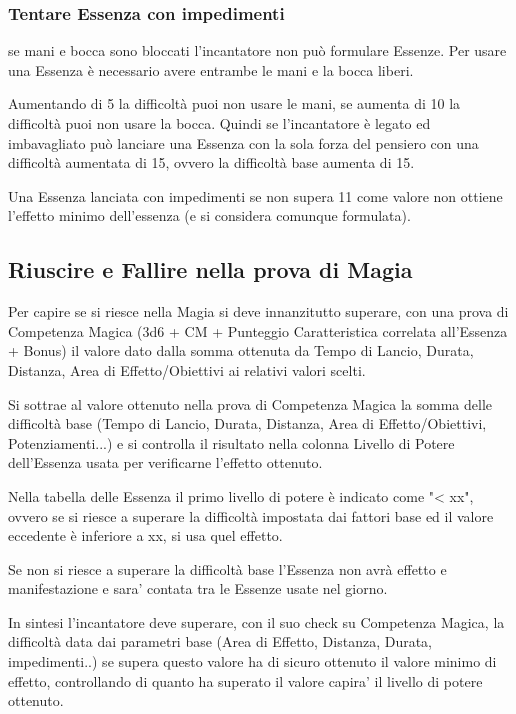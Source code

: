 \documentclass[a4paper,11pt,twoside,openany]{book}
\begin{document}
\subsubsection{Tentare Essenza con impedimenti}

se mani e bocca sono bloccati l'incantatore non può formulare Essenze. Per usare una Essenza è necessario avere entrambe le mani e la bocca liberi.

Aumentando di 5 la difficoltà puoi non usare le mani, se aumenta di 10 la difficoltà puoi non usare la bocca. Quindi se l'incantatore è legato ed imbavagliato può lanciare una Essenza con la sola forza del pensiero con una difficoltà aumentata di 15, ovvero la difficoltà base aumenta di 15.

Una Essenza lanciata con impedimenti se non supera 11 come valore non ottiene l'effetto minimo dell'essenza (e si considera comunque formulata).

\subsection{Riuscire e Fallire nella prova di Magia}

\label{riuscire-e-fallire-nella-prova-di-magia}

Per capire se si riesce nella Magia si deve innanzitutto superare, con una prova di Competenza Magica (3d6 + CM + Punteggio Caratteristica correlata all'Essenza + Bonus) il valore dato dalla somma ottenuta da Tempo di Lancio, Durata, Distanza, Area di Effetto/Obiettivi ai relativi valori scelti.

Si sottrae al valore ottenuto nella prova di Competenza Magica la somma delle difficoltà base (Tempo di Lancio, Durata, Distanza, Area di Effetto/Obiettivi, Potenziamenti...) e si controlla il risultato nella colonna Livello di Potere dell'Essenza usata per verificarne l'effetto ottenuto.

Nella tabella delle Essenza il primo livello di potere è indicato come "< xx", ovvero se si riesce a superare la difficoltà impostata dai fattori base ed il valore eccedente è inferiore a xx, si usa quel effetto.

Se non si riesce a superare la difficoltà base l'Essenza non avrà effetto e manifestazione e sara' contata tra le Essenze usate nel giorno.

In sintesi l'incantatore deve superare, con il suo check su Competenza Magica, la difficoltà data dai parametri base (Area di Effetto, Distanza, Durata, impedimenti..) se supera questo valore ha di sicuro ottenuto il valore minimo di effetto, controllando di quanto ha superato il valore capira' il livello di potere ottenuto.
\end{document}
